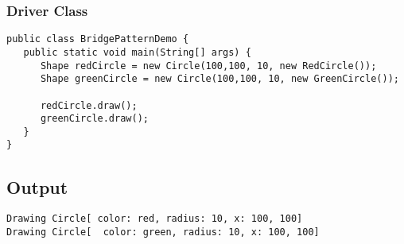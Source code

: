 \subsubsection{Driver Class}

\begin{verbatim}
public class BridgePatternDemo {
   public static void main(String[] args) {
      Shape redCircle = new Circle(100,100, 10, new RedCircle());
      Shape greenCircle = new Circle(100,100, 10, new GreenCircle());

      redCircle.draw();
      greenCircle.draw();
   }
}
\end{verbatim}

\subsection{Output}

\begin{verbatim}
Drawing Circle[ color: red, radius: 10, x: 100, 100]
Drawing Circle[  color: green, radius: 10, x: 100, 100]
\end{verbatim}
